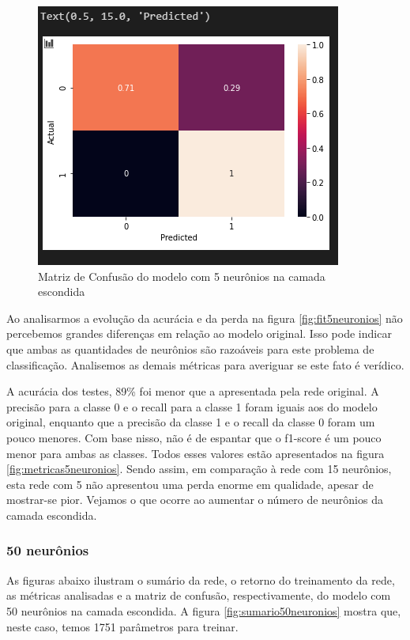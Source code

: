 \documentclass[12pt]{article}
\begin{document}
\begin{figure}[H]
	\centering
	\includegraphics[width=0.7\linewidth]{Imagens/5neuronios/confusao5neuronios}
	\caption{Matriz de Confusão do modelo com 5 neurônios na camada escondida}
	\label{fig:confusao5neuronios}
\end{figure}

Ao analisarmos a evolução da acurácia e da perda na figura \ref{fig:fit5neuronios} não percebemos grandes diferenças em relação ao modelo original. Isso pode indicar que ambas as quantidades de neurônios são razoáveis para este problema de classificação. Analisemos as demais métricas para averiguar se este fato é verídico.

A acurácia dos testes, 89\% foi menor que a apresentada pela rede original. A precisão para a classe 0 e o recall para a classe 1 foram iguais aos do modelo original, enquanto que a precisão da classe 1 e o recall da classe 0 foram um pouco menores. Com base nisso, não é de espantar que o f1-score é um pouco menor para ambas as classes. Todos esses valores estão apresentados na figura \ref{fig:metricas5neuronios}. Sendo assim, em comparação à rede com 15 neurônios, esta rede com 5 não apresentou uma perda enorme em qualidade, apesar de mostrar-se pior. Vejamos o que ocorre ao aumentar o número de neurônios da camada escondida.

\subsubsection{50 neurônios}

As figuras abaixo ilustram o sumário da rede, o retorno do treinamento da rede, as métricas analisadas e a matriz de confusão, respectivamente, do modelo com 50 neurônios na camada escondida. A figura \ref{fig:sumario50neuronios} mostra que, neste caso, temos 1751 parâmetros para treinar.
\end{document}
